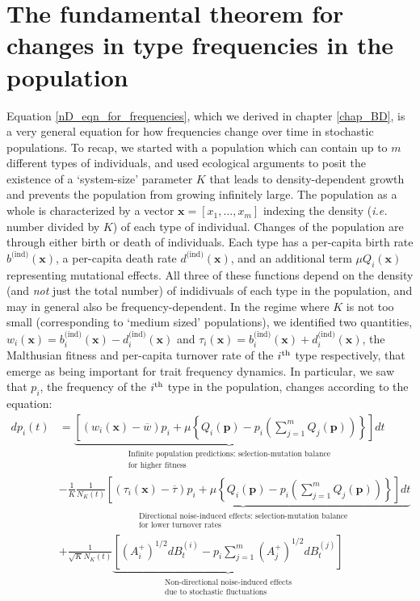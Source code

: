 \section{The fundamental theorem for changes in type frequencies in the population}\label{sec_fun_theorem_freq}
Equation \eqref{nD_eqn_for_frequencies}, which we derived in chapter \ref{chap_BD}, is a very general equation for how frequencies change over time in stochastic populations. To recap, we started with a population which can contain up to $m$ different types of individuals, and used ecological arguments to posit the existence of a `system-size' parameter $K$ that leads to density-dependent growth and prevents the population from growing infinitely large. The population as a whole is characterized by a vector $\mathbf{x} = [x_1, \ldots, x_m]$ indexing the density (\emph{i.e.} number divided by $K$) of each type of individual. Changes of the population are through either birth or death of individuals. Each type has a per-capita birth rate $b^{\textrm{(ind)}}(\mathbf{x})$, a per-capita death rate $d^{\textrm{(ind)}}(\mathbf{x})$, and an additional term $\mu Q_{i}(\mathbf{x})$ representing mutational effects. All three of these functions depend on the density (and \emph{not} just the total number) of indidivuals of each type in the population, and may in general also be frequency-dependent. In the regime where $K$ is not too small (corresponding to `medium sized' populations), we identified two quantities, $w_i(\mathbf{x}) = b^{\textrm{(ind)}}_{i}(\mathbf{x}) - d^{\textrm{(ind)}}_{i}(\mathbf{x})$ and $\tau_i(\mathbf{x}) = b^{\textrm{(ind)}}_{i}(\mathbf{x}) + d^{\textrm{(ind)}}_{i}(\mathbf{x})$, the Malthusian fitness and per-capita turnover rate of the $i\textsuperscript{th}$ type respectively, that emerge as being important for trait frequency dynamics. In particular, we saw that $p_i$, the frequency of the $i\textsuperscript{th}$ type in the population, changes according to the equation:
\begin{equation}
\label{nD_stochastic_RM}
\begin{aligned}
dp_i(t) &= \underbrace{\left[(w_i(\mathbf{x}) - \overline{w})p_i + \mu\left\{Q_i(\mathbf{p}) - p_i\left(\sum\limits_{j=1}^{m}Q_j(\mathbf{p})\right)\right\}\right]dt}_{\substack{\text{Infinite population predictions: selection-mutation balance} \\ \text{for higher fitness}}}\\
&- \frac{1}{K}\underbrace{\frac{1}{N_{K}(t)}\left[(\tau_i(\mathbf{x}) - \overline{\tau})p_i + \mu\left\{Q_i(\mathbf{p}) - p_i\left(\sum\limits_{j=1}^{m}Q_j(\mathbf{p})\right)\right\}\right]dt}_{\substack{\text{Directional noise-induced effects: selection-mutation balance}\\\text{for lower turnover rates}}}\\
&+ \frac{1}{\sqrt{K}N_{K}(t)}\underbrace{\left[\left(A^{+}_{i}\right)^{1/2}dB^{(i)}_t - p_i\sum\limits_{j=1}^{m}\left(A^{+}_{j}\right)^{1/2}dB^{(j)}_t\right]}_{\substack{\text{Non-directional noise-induced effects}\\\text{due to stochastic fluctuations}}}
\end{aligned}
\end{equation}
